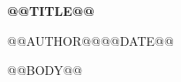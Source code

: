\documentclass[UTF8,zihao=-4,fontset=none]{ctexart}
\begin{document}
\begin{center}
  {\bfseries @@TITLE@@\par}
  \vspace{0.6em}
  {@@AUTHOR@@\quad @@DATE@@}
\end{center}

\noindent{}

@@BODY@@

\vspace{1em}
\noindent{}
\end{document}
